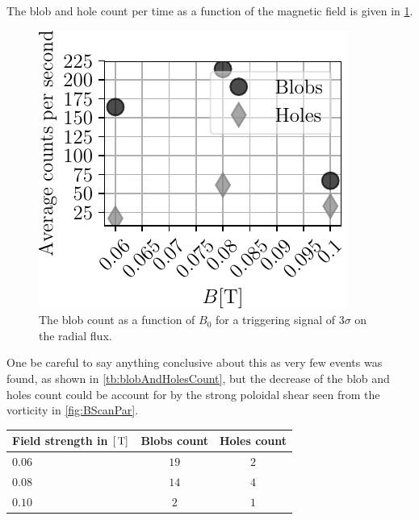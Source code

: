 The blob and hole count per time as a function of the magnetic field is given in \cref{fig:BScanBlobCount}.
%
\begin{figure}[htb]
    \centering
    \includegraphics{fig/results/bScan/BScanBlobCount}
    \caption{The blob count as a function of $B_0$ for a triggering signal of $3\sigma$ on the radial flux.}
    \label{fig:BScanBlobCount}
\end{figure}
%
One be careful to say anything conclusive about this as very few events was found, as shown in \cref{tb:blobAndHolesCount}, but the decrease of the blob and holes count could be account for by the strong poloidal shear seen from the vorticity in \cref{fig:BScanPar}.
%
\begin{center}
        \begin{tabular}{l|cc}
            \hline
            Field strength in $[\, \text{T}]$ & Blobs count & Holes count\\
            \hline
            $0.06$ & $19$ & $2$ \\
            $0.08$ & $14$ & $4$ \\
            $0.10$ & $ 2$ & $1$ \\
            \hline\hline
        \end{tabular}
        \label{tb:blobAndHolesCount}
\end{center}
%

